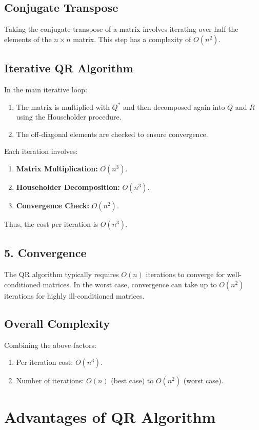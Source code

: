 \documentclass[12pt]{article}
\begin{document}
\subsection{Conjugate Transpose}
Taking the conjugate transpose of a matrix involves iterating over half the elements of the \(n \times n\) matrix. This step has a complexity of \(O(n^2)\).

\subsection{Iterative QR Algorithm}
In the main iterative loop:
\begin{enumerate}
    \item The matrix is multiplied with \(Q^*\) and then decomposed again into \(Q\) and \(R\) using the Householder procedure.
    \item The off-diagonal elements are checked to ensure convergence.
\end{enumerate}
Each iteration involves:
\begin{enumerate}
    \item \textbf{Matrix Multiplication:} \(O(n^3)\).
    \item \textbf{Householder Decomposition:} \(O(n^3)\).
    \item \textbf{Convergence Check:} \(O(n^2)\).
\end{enumerate}
Thus, the cost per iteration is \(O(n^3)\).

\subsection*{5. Convergence}
The QR algorithm typically requires \(O(n)\) iterations to converge for well-conditioned matrices. In the worst case, convergence can take up to \(O(n^2)\) iterations for highly ill-conditioned matrices.

\subsection*{Overall Complexity}
Combining the above factors:
\begin{enumerate}
    \item Per iteration cost: \(O(n^3)\).
    \item Number of iterations: \(O(n)\) (best case) to \(O(n^2)\) (worst case).
\end{enumerate}

\section{Advantages of QR Algorithm}
\end{document}
